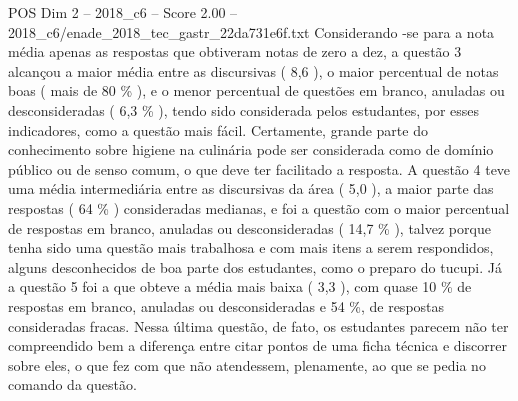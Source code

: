 \begin{textsample}{POS Dim 2 – 2018\_c6 – Score 2.00 – 2018\_c6/enade\_2018\_tec\_gastr\_22da731e6f.txt}
Considerando -se para a nota média apenas as respostas que obtiveram notas de zero a dez, a questão 3 alcançou a maior média entre as discursivas ( 8,6 ), o maior percentual de notas boas ( mais de 80 \% ), e o menor percentual de questões em branco, anuladas ou desconsideradas ( 6,3 \% ), tendo sido considerada pelos estudantes, por esses indicadores, como a questão mais fácil.
Certamente, grande parte do conhecimento sobre higiene na culinária pode ser considerada como de domínio público ou de senso comum, o que deve ter facilitado a resposta.
A questão 4 teve uma média intermediária entre as discursivas da área ( 5,0 ), a maior parte das respostas ( 64 \% ) consideradas medianas, e foi a questão com o maior percentual de respostas em branco, anuladas ou desconsideradas ( 14,7 \% ), talvez porque tenha sido uma questão mais trabalhosa e com mais itens a serem respondidos, alguns desconhecidos de boa parte dos estudantes, como o preparo do tucupi.
Já a questão 5 foi a que obteve a média mais baixa ( 3,3 ), com quase 10 \% de respostas em branco, anuladas ou desconsideradas e 54 \%, de respostas consideradas fracas.
Nessa última questão, de fato, os estudantes parecem não ter compreendido bem a diferença entre citar pontos de uma ficha técnica e discorrer sobre eles, o que fez com que não atendessem, plenamente, ao que se pedia no comando da questão.

\end{textsample}
